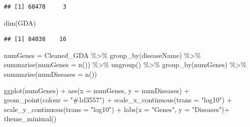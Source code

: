 \documentclass[
]{book}
\newenvironment{Shaded}{\begin{snugshade}}{\end{snugshade}}
\newcommand{\AttributeTok}[1]{\textcolor[rgb]{0.77,0.63,0.00}{#1}}
\newcommand{\FunctionTok}[1]{\textcolor[rgb]{0.00,0.00,0.00}{#1}}
\newcommand{\NormalTok}[1]{#1}
\newcommand{\OtherTok}[1]{\textcolor[rgb]{0.56,0.35,0.01}{#1}}
\newcommand{\SpecialCharTok}[1]{\textcolor[rgb]{0.00,0.00,0.00}{#1}}
\newcommand{\StringTok}[1]{\textcolor[rgb]{0.31,0.60,0.02}{#1}}
\begin{document}
\begin{verbatim}
## [1] 60478     3
\end{verbatim}

\begin{Shaded}
\begin{Highlighting}[]
\FunctionTok{dim}\NormalTok{(GDA)}
\end{Highlighting}
\end{Shaded}

\begin{verbatim}
## [1] 84038    16
\end{verbatim}

\begin{Shaded}
\begin{Highlighting}[]
\NormalTok{numGenes }\OtherTok{=}\NormalTok{ Cleaned\_GDA }\SpecialCharTok{\%\textgreater{}\%} 
  \FunctionTok{group\_by}\NormalTok{(diseaseName) }\SpecialCharTok{\%\textgreater{}\%}
  \FunctionTok{summarise}\NormalTok{(}\AttributeTok{numGenes =} \FunctionTok{n}\NormalTok{()) }\SpecialCharTok{\%\textgreater{}\%}
  \FunctionTok{ungroup}\NormalTok{() }\SpecialCharTok{\%\textgreater{}\%}
  \FunctionTok{group\_by}\NormalTok{(numGenes) }\SpecialCharTok{\%\textgreater{}\%}
  \FunctionTok{summarise}\NormalTok{(}\AttributeTok{numDiseases =} \FunctionTok{n}\NormalTok{())}
\end{Highlighting}
\end{Shaded}

\begin{Shaded}
\begin{Highlighting}[]
\FunctionTok{ggplot}\NormalTok{(numGenes) }\SpecialCharTok{+}
  \FunctionTok{aes}\NormalTok{(}\AttributeTok{x =}\NormalTok{ numGenes, }\AttributeTok{y =}\NormalTok{ numDiseases) }\SpecialCharTok{+}
  \FunctionTok{geom\_point}\NormalTok{(}\AttributeTok{colour =} \StringTok{"\#1d3557"}\NormalTok{) }\SpecialCharTok{+}
  \FunctionTok{scale\_x\_continuous}\NormalTok{(}\AttributeTok{trans =} \StringTok{"log10"}\NormalTok{) }\SpecialCharTok{+}
  \FunctionTok{scale\_y\_continuous}\NormalTok{(}\AttributeTok{trans =} \StringTok{"log10"}\NormalTok{) }\SpecialCharTok{+}
  \FunctionTok{labs}\NormalTok{(}\AttributeTok{x =} \StringTok{"Genes"}\NormalTok{, }\AttributeTok{y =} \StringTok{"Diseases"}\NormalTok{)}\SpecialCharTok{+}
  \FunctionTok{theme\_minimal}\NormalTok{()}
\end{Highlighting}
\end{Shaded}
\end{document}
